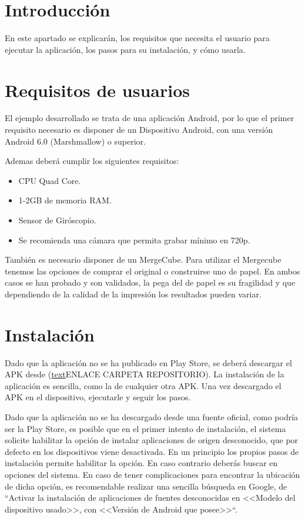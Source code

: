 
\section{Introducción}
 En este apartado se explicarán, los requisitos que necesita el usuario para ejecutar la aplicación, los pasos para su instalación, y cómo usarla.
  
\section{Requisitos de usuarios}
 El ejemplo desarrollado se trata de una aplicación Android, por lo que el primer requisito necesario es disponer de un Dispositivo Android, con una versión Android 6.0 (Marshmallow) o superior.
  
 Ademas deberá cumplir los siguientes requisitos\cite{vuforia_devices}:
 \begin{itemize}
 	\item CPU Quad Core.
 	\item 1-2GB de memoria RAM.
 	\item Sensor de Giróscopio.
 	\item Se recomienda una cámara que permita grabar mínimo en 720p.  
 \end{itemize}
También es necesario disponer de un MergeCube. Para utilizar el Mergecube tenemos las opciones de comprar el original o construirse uno de papel. En ambos casos se han probado y son validados, la pega del de papel es su fragilidad y que dependiendo de la calidad de la impresión los resultados pueden variar.

\section{Instalación}

Dado que la aplicación no se ha publicado en Play Store, se deberá descargar el APK desde (\href{URL}{text}ENLACE CARPETA REPOSITORIO).
La instalación de la aplicación es sencilla, como la de cualquier otra APK. Una vez descargado el APK en el dispositivo, ejecutarle y seguir los pasos. 

Dado que la aplicación no se ha descargado desde una fuente oficial, como podría ser la Play Store, es posible que en el primer intento de instalación, el sistema solicite habilitar la opción de instalar aplicaciones de origen desconocido, que por defecto en los dispositivos viene desactivada.
En un principio los propios pasos de instalación permite habilitar la opción. En caso contrario deberás buscar en opciones del sistema. En caso de tener complicaciones para encontrar la ubicación de dicha opción, es recomendable realizar una sencilla búsqueda en Google, de ``Activar la instalación de aplicaciones de fuentes desconocidas en <<Modelo del dispositivo usado>>, con <<Versión de Android que posee>>``.


